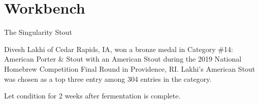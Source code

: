 \documentclass[fontsize=9pt,oneside]{scrbook}
\begin{document}
\mainmatter
\twocolumn

\part{Workbench}


\begin{recipie}{The Singularity Stout}

\begin{aboutblock}
Divesh Lakhi of Cedar Rapids, IA, won a bronze medal in Category \#14: American
Porter \& Stout with an American Stout during the 2019 National Homebrew
Competition Final Round in Providence, RI. Lakhi's American Stout was chosen as
a top three entry among 304 entries in the category. \sourceaha
\end{aboutblock}


\begin{methodandtiming}
 
\begin{mashsteps}
\end{mashsteps}

\begin{fermentationsteps}
\end{fermentationsteps}

\begin{directions}
Let condition for 2 weeks after fermentation is complete.
\end{directions}

\end{methodandtiming}

\pagebreak

\begin{ingredientsblock}

\begin{malts}
\end{malts}

\begin{hops}
\end{hops}


\end{ingredientsblock}

\end{recipie}

\backmatter


\end{document}
